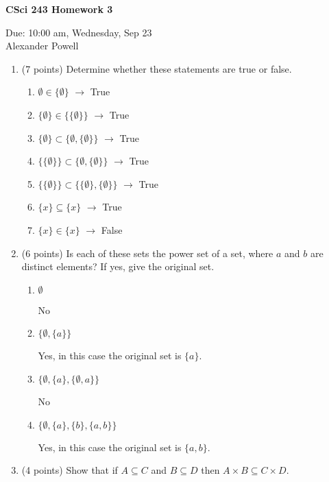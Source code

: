 \documentclass[11pt]{article}
\begin{document}
\begin{center}             %
\begin{LARGE}
{\bf CSci 243 Homework 3}
\end{LARGE}
\vskip 0.25cm      %

Due: 10:00 am, Wednesday, Sep 23 \\  %
Alexander Powell
\end{center}

\begin{enumerate}

\item (7 points) 
Determine whether these statements are true or false.
\begin{enumerate}
\item $\emptyset\in\{\emptyset\}$ $\longrightarrow$ True
\item $\{\emptyset\}\in\{\{\emptyset\}\}$ $\longrightarrow$ True
\item $\{\emptyset\}\subset\{\emptyset,\{\emptyset\}\}$ $\longrightarrow$ True
\item $\{\{\emptyset\}\}\subset\{\emptyset,\{\emptyset\}\}$ $\longrightarrow$ True
\item $\{\{\emptyset\}\}\subset\{\{\emptyset\},\{\emptyset\}\}$ $\longrightarrow$ True
\item $\{x\} \subseteq \{x\}$ $\longrightarrow$ True
\item $\{x\} \in \{x\}$ $\longrightarrow$ False
\end{enumerate}

\item (6 points) Is each of these sets the power set of a set, where $a$ and $b$ are distinct elements? If yes, give the original set.
\begin{enumerate}
\item $\emptyset$

No
\item $\{\emptyset,\{a\}\}$

Yes, in this case the original set is $\{a\}$.  
\item $\{\emptyset,\{a\},\{\emptyset,a\}\}$

No
\item $\{\emptyset,\{a\},\{b\},\{a,b\}\}$

Yes, in this case the original set is $\{a,b\}$.  
\end{enumerate} 


\item (4 points) Show that if $A\subseteq C$ and $B\subseteq D$ then $A\times B\subseteq C\times D$.


\end{enumerate}
\end{document}
